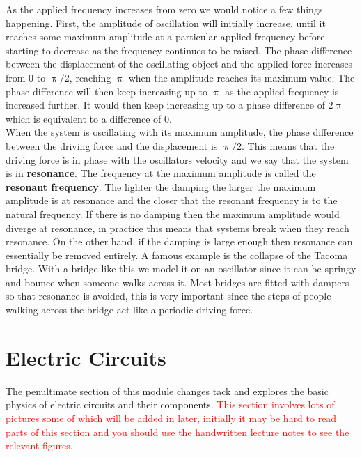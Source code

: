 \documentclass[a4paper,12pt]{book}
\begin{document}
As the applied frequency increases from zero we would notice a few things happening. First, the amplitude of oscillation will initially increase, until it reaches some maximum amplitude at a particular applied frequency before starting to decrease as the frequency continues to be raised. The phase difference between the displacement of the oscillating object and the applied force increases from $0$ to $\uppi/2$, reaching $\uppi$ when the amplitude reaches its maximum value. The phase difference will then keep increasing up to $\uppi$ as the applied frequency is increased further. It would then keep increasing up to a phase difference of $2\uppi$ which is equivalent to a difference of $0$.\\

When the system is oscillating with its maximum amplitude, the phase difference between the driving force and the displacement is $\uppi/2$. This means that the driving force is in phase with the oscillators velocity and we say that the system is in \textbf{resonance}. The frequency at the maximum amplitude is called the \textbf{resonant frequency}. The lighter the damping the larger the maximum amplitude is at resonance and the closer that the resonant frequency is to the natural frequency. If there is no damping then the maximum amplitude would diverge at resonance, in practice this means that systems break when they reach resonance. On the other hand, if the damping is large enough then resonance can essentially be removed entirely. A famous example is the collapse of the Tacoma bridge. With a bridge like this we model it on an oscillator since it can be springy and bounce when someone walks across it. Most bridges are fitted with dampers so that resonance is avoided, this is very important since the steps of people walking across the bridge act like a periodic driving force.\\



\chapter{Electric Circuits}
The penultimate section of this module changes tack and explores the basic physics of electric circuits and their components. \textcolor{red}{This section involves lots of pictures some of which will be added in later, initially it may be hard to read parts of this section and you should use the handwritten lecture notes to see the relevant figures.}
\end{document}
